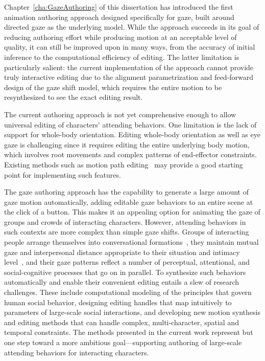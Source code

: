 Chapter~\ref{cha:GazeAuthoring} of this dissertation has introduced the first animation authoring approach designed specifically for gaze, built around directed gaze as the underlying model. While the approach succeeds in its goal of reducing authoring effort while producing motion at an acceptable level of quality, it can still be improved upon in many ways, from the accuracy of initial inference to the computational efficiency of editing. The latter limitation is particularly salient: the current implementation of the approach cannot provide truly interactive editing due to the alignment parametrization and feed-forward design of the gaze shift model, which requires the entire motion to be resynthesized to see the exact editing result.

The current authoring approach is not yet comprehensive enough to allow universal editing of characters' attending behaviors. One limitation is the lack of support for whole-body orientation. Editing whole-body orientation as well as eye gaze is challenging since it requires editing the entire underlying body motion, which involves root movements and complex patterns of end-effector constraints. Existing methods such as motion path editing~\citep{gleicher2001path} may provide a good starting point for implementing such features.

The gaze authoring approach has the capability to generate a large amount of gaze motion automatically, adding editable gaze behaviors to an entire scene at the click of a button. This makes it an appealing option for animating the gaze of groups and crowds of interacting characters. However, attending behaviors in such contexts are more complex than simple gaze shifts. Groups of interacting people arrange themselves into conversational formations~\citep{kendon2010spacing}, they maintain mutual gaze and interpersonal distance appropriate to their situation and intimacy level~\citep{argyle1965eyecontact}, and their gaze patterns reflect a number of perceptual, attentional, and social-cognitive processes that go on in parallel. To synthesize such behaviors automatically and enable their convenient editing entails a slew of research challenges. These include computational modeling of the principles that govern human social behavior, designing editing handles that map intuitively to parameters of large-scale social interactions, and developing new motion synthesis and editing methods that can handle complex, multi-character, spatial and temporal constraints. The methods presented in the current work represent but one step toward a more ambitious goal---supporting authoring of large-scale attending behaviors for interacting characters. 